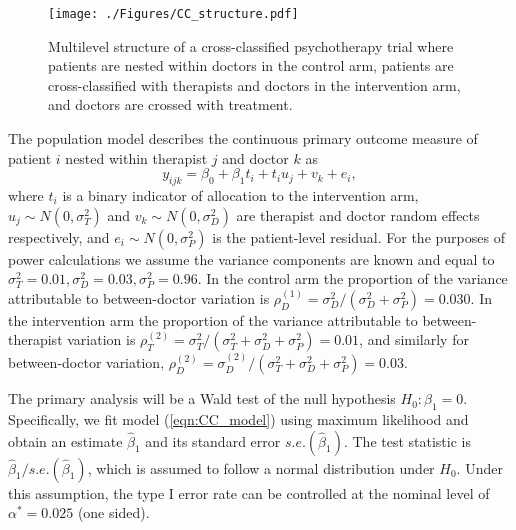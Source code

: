 \documentclass{article} %
\begin{document}
\begin{figure}
\centering
\texttt{[image: ./Figures/CC\_structure.pdf]}
\caption{Multilevel structure of a cross-classified psychotherapy trial where patients are nested within doctors in the control arm, patients are cross-classified with therapists and doctors in the intervention arm, and doctors are crossed with treatment.}
\label{fig:CC_structure}
\end{figure}

The population model describes the continuous primary outcome measure of patient $i$ nested within therapist $j$ and doctor $k$ as
\begin{equation}\label{eqn:CC_model}
y_{ijk} = \beta_{0} + \beta_{1}t_{i} + t_{i}u_{j} + v_{k} + e_{i},
\end{equation}
where $t_{i}$ is a binary indicator of allocation to the intervention arm, $u_{j} \sim N(0, \sigma_{T}^{2})$ and $v_{k} \sim N(0, \sigma_{D}^{2})$ are therapist and doctor random effects respectively, and $e_{i} \sim N(0, \sigma_{P}^{2})$ is the patient-level residual. For the purposes of power calculations we assume the variance components are known and equal to $\sigma_{T}^{2} = 0.01, \sigma_{D}^{2} = 0.03, \sigma_{P}^{2} = 0.96$. In the control arm the proportion of the variance attributable to between-doctor variation is $\rho_{D}^{(1)} = \sigma^{2}_{D}/(\sigma^{2}_{D} + \sigma^{2}_{P}) = 0.030$. In the intervention arm the proportion of the variance attributable to between-therapist variation is $\rho_{T}^{(2)} = \sigma^{2}_{T}/(\sigma^{2}_{T} + \sigma^{2}_{D} + \sigma^{2}_{P}) = 0.01$, and similarly for between-doctor variation, $\rho_{D}^{(2)} = \sigma^{(2)}_{D}/(\sigma^{2}_{T} + \sigma^{2}_{D} + \sigma^{2}_{P}) = 0.03$.

The primary analysis will be a Wald test of the null hypothesis $H_{0}: \beta_{1} = 0$. Specifically, we fit  model (\ref{eqn:CC_model}) using maximum likelihood and obtain an estimate $\hat{\beta}_{1}$ and its standard error $s.e.(\hat{\beta}_{1})$. The test statistic is $\hat{\beta}_{1} / s.e.(\hat{\beta}_{1})$, which is assumed to follow a normal distribution under $H_{0}$. Under this assumption, the type I error rate can be controlled at the nominal level of $\alpha^{*} = 0.025$ (one sided). %
\end{document}
